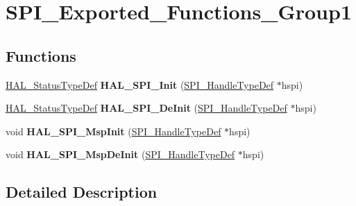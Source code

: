 \hypertarget{group___s_p_i___exported___functions___group1}{}\section{S\+P\+I\+\_\+\+Exported\+\_\+\+Functions\+\_\+\+Group1}
\label{group___s_p_i___exported___functions___group1}
\subsection*{Functions}
\begin{DoxyCompactItemize}
\item 
\mbox{\label{group___s_p_i___exported___functions___group1_gaadb9d40e710c714d96b2501996658c44}} 
\hyperlink{stm32f0xx__hal__def_8h_a63c0679d1cb8b8c684fbb0632743478f}{H\+A\+L\+\_\+\+Status\+Type\+Def} {\bfseries H\+A\+L\+\_\+\+S\+P\+I\+\_\+\+Init} (\hyperlink{group___s_p_i___exported___types_gab3bd115785297692c125528b7293566b}{S\+P\+I\+\_\+\+Handle\+Type\+Def} $\ast$hspi)
\item 
\mbox{\label{group___s_p_i___exported___functions___group1_gaca2db2a7bbed96ac013c565080fb61f2}} 
\hyperlink{stm32f0xx__hal__def_8h_a63c0679d1cb8b8c684fbb0632743478f}{H\+A\+L\+\_\+\+Status\+Type\+Def} {\bfseries H\+A\+L\+\_\+\+S\+P\+I\+\_\+\+De\+Init} (\hyperlink{group___s_p_i___exported___types_gab3bd115785297692c125528b7293566b}{S\+P\+I\+\_\+\+Handle\+Type\+Def} $\ast$hspi)
\item 
\mbox{\label{group___s_p_i___exported___functions___group1_ga17f583be14b22caffa6c4e56dcd035ef}} 
void {\bfseries H\+A\+L\+\_\+\+S\+P\+I\+\_\+\+Msp\+Init} (\hyperlink{group___s_p_i___exported___types_gab3bd115785297692c125528b7293566b}{S\+P\+I\+\_\+\+Handle\+Type\+Def} $\ast$hspi)
\item 
\mbox{\label{group___s_p_i___exported___functions___group1_gabadc4d4974af1afd943e8d13589068e1}} 
void {\bfseries H\+A\+L\+\_\+\+S\+P\+I\+\_\+\+Msp\+De\+Init} (\hyperlink{group___s_p_i___exported___types_gab3bd115785297692c125528b7293566b}{S\+P\+I\+\_\+\+Handle\+Type\+Def} $\ast$hspi)
\end{DoxyCompactItemize}


\subsection{Detailed Description}
